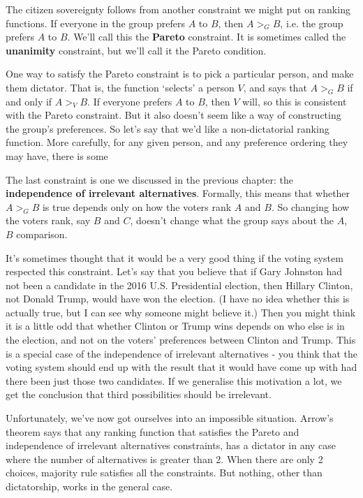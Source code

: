 \begin{multicols}{2}
The citizen sovereignty follows from another constraint we might put on ranking functions. If everyone in the group prefers $A$ to $B$, then $A >_G B$, i.e. the group prefers $A$ to $B$. We'll call this the \textbf{Pareto} constraint. It is sometimes called the \textbf{unanimity} constraint, but we'll call it the Pareto condition.

One way to satisfy the Pareto constraint is to pick a particular person, and make them dictator. That is, the function `selects' a person $V$, and says that $A >_G B$ if and only if $A >_V B$. If everyone prefers $A$ to $B$, then $V$ will, so this is consistent with the Pareto constraint. But it also doesn't seem like a way of constructing the group's preferences. So let's say that we'd like a non-dictatorial ranking function. More carefully, for any given person, and any preference ordering they may have, there is some 

The last constraint is one we discussed in the previous chapter: the \textbf{independence of irrelevant alternatives}. Formally, this means that whether $A >_G B$ is true depends only on how the voters rank $A$ and $B$. So changing how the voters rank, say $B$ and $C$, doesn't change what the group says about the $A$, $B$ comparison.

It's sometimes thought that it would be a very good thing if the voting system respected this constraint. Let's say that you believe that if Gary Johnston had not been a candidate in the 2016 U.S. Presidential election, then Hillary Clinton, not Donald Trump, would have won the election. (I have no idea whether this is actually true, but I can see why someone might believe it.) Then you might think it is a little odd that whether Clinton or Trump wins depends on who else is in the election, and not on the voters' preferences between Clinton and Trump. This is a special case of the independence of irrelevant alternatives - you think that the voting system should end up with the result that it would have come up with had there been just those two candidates. If we generalise this motivation a lot, we get the conclusion that third possibilities should be irrelevant.

Unfortunately, we've now got ourselves into an impossible situation. Arrow's theorem says that any ranking function that satisfies the Pareto and independence of irrelevant alternatives constraints, has a dictator in any case where the number of alternatives is greater than 2. When there are only 2 choices, majority rule satisfies all the constraints. But nothing, other than dictatorship, works in the general case.


\end{multicols}
